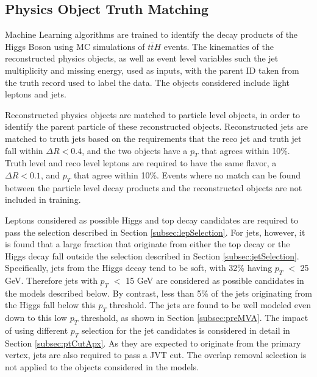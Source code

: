 \subsection{Physics Object Truth Matching}
\label{sec:truthLevelReco}

Machine Learning algorithms are trained to identify the decay products of the Higgs Boson using MC simulations of $t\bar{t}H$ events. The kinematics of the reconstructed physics objects, as well as event level variables such the jet multiplicity and missing energy, used as inputs, with the parent ID taken from the truth record used to label the data. The objects considered include light leptons and jets. 

Reconstructed physics objects are matched to particle level objects, in order to identify the parent particle of these reconstructed objects. Reconstructed jets are matched to truth jets based on the requirements that the reco jet and truth jet fall within $\Delta R < 0.4$, and the two objects have a $p_T$ that agrees within 10\%. Truth level and reco level leptons are required to have the same flavor, a $\Delta R < 0.1$, and $p_T$ that agree within 10\%. Events where no match can be found between the particle level decay products and the reconstructed objects are not included in training.


Leptons considered as possible Higgs and top decay candidates are required to pass the selection described in Section \ref{subsec:lepSelection}. For jets, however, it is found that a large fraction that originate from either the top decay or the Higgs decay fall outside the selection described in Section \ref{subsec:jetSelection}. Specifically, jets from the Higgs decay tend to be soft, with 32\% having $p_T$ $<$ 25 GeV. Therefore jets with $p_T$ $<$ 15 GeV are considered as possible candidates in the models described below. By contrast, less than 5\% of the jets originating from the Higgs fall below this $p_T$ threshold. The jets are found to be well modeled even down to this low $p_T$ threshold, as shown in Section \ref{subsec:preMVA}. The impact of using different $p_T$ selection for the jet candidates is considered in detail in Section \ref{subsec:ptCutApx}. As they are expected to originate from the primary vertex, jets are also required to pass a JVT cut. The overlap removal selection is not applied to the objects considered in the models.

